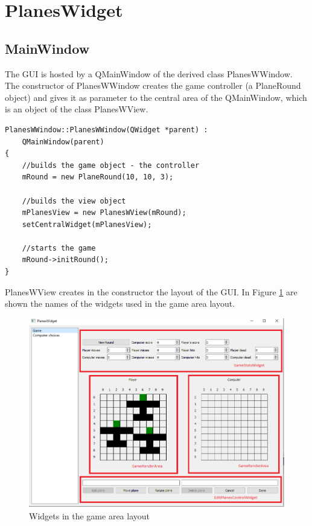 \section {PlanesWidget}

\subsection{MainWindow}

The GUI is hosted by a QMainWindow of the derived class PlanesWWindow. The constructor of PlanesWWindow creates the game controller (a PlaneRound object) and gives it as parameter to the central area of the QMainWindow, which is an object of the class PlanesWView.


\begin{lstlisting}
PlanesWWindow::PlanesWWindow(QWidget *parent) :
	QMainWindow(parent)
{
	//builds the game object - the controller
	mRound = new PlaneRound(10, 10, 3);
	
	//builds the view object
	mPlanesView = new PlanesWView(mRound);
	setCentralWidget(mPlanesView);
	
	//starts the game
	mRound->initRound();
}

\end{lstlisting}

PlanesWView creates in the constructor the layout of the GUI. In Figure \ref{fig:planeswidget_game_widgetnames} are shown the names of the widgets used in the game area layout.

\begin{figure}[h]
	\includegraphics[width = \textwidth]{PlanesWidget_Game_WidgetNames.png}
	\caption{Widgets in the game area layout}
	\label{fig:planeswidget_game_widgetnames}
\end{figure}

